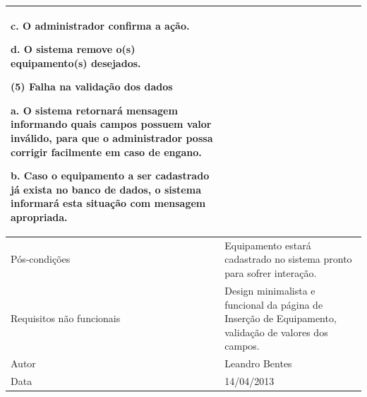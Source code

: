 \begin{flushleft}
\begin{supertabular}{|m{5.5680003cm}|m{9.325cm}|}
c. O administrador confirma a ação.

d. O sistema remove o(s) equipamento(s) desejados.

(5) Falha na validação dos dados

a. O sistema retornará mensagem informando quais campos possuem valor inválido, para que o administrador possa corrigir facilmente em caso de engano.

b. Caso o equipamento a ser cadastrado já exista no banco de dados, o sistema informará esta situação com mensagem apropriada. \\\hline
Pós-condições &
Equipamento estará cadastrado no sistema pronto para sofrer interação.\\\hline
Requisitos não funcionais &
Design minimalista e funcional da página de Inserção de Equipamento, validação de valores dos campos.\\\hline
Autor &
Leandro Bentes\\\hline
Data &
14/04/2013\\\hline
\end{supertabular}
\end{flushleft}


